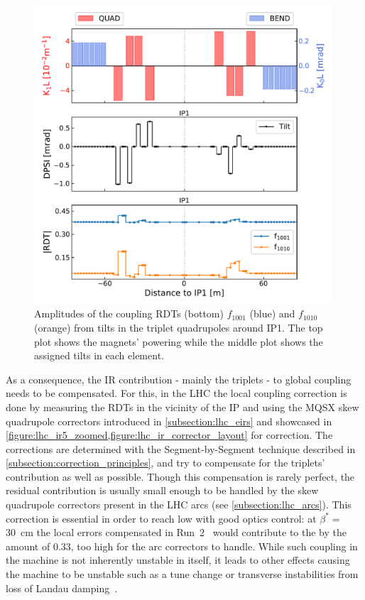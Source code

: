 \begin{figure}[!htb]
    \centering
    \includegraphics*[width=0.99\textwidth]{Figures/IR_Coupling_Correction/triplet_tilts_to_rdts.pdf}
    \caption{Amplitudes of the coupling RDTs (bottom) \(f_{1001}\) (\textcolor{mplblue}{blue}) and \(f_{1010}\) (\textcolor{mplorange}{orange}) from tilts in the triplet quadrupoles around IP\num{1}. The top plot shows the magnets' powering while the middle plot shows the assigned tilts in each element.}
    \label{figure:triplet_tilts_to_rdts}
\end{figure}

As a consequence, the IR contribution - mainly the triplets - to global coupling needs to be compensated.
For this, in the LHC the local coupling correction is done by measuring the RDTs in the vicinity of the IP and using the MQSX \gls{skew} quadrupole correctors introduced in \cref{subsection:lhc_eirs} and showcased in \cref{figure:lhc_ir5_zoomed,figure:lhc_ir_corrector_layout} for correction.
The corrections are determined with the Segment-by-Segment technique described in \cref{subsection:correction_principles}, and try to compensate for the triplets' contribution as well as possible.
Though this compensation is rarely perfect, the residual contribution is usually small enough to be handled by the skew quadrupole correctors present in the LHC arcs (see \cref{subsection:lhc_arcs}).
This correction is essential in order to reach low  with good optics control: at \(\beta^{*}=\) \qty{30}{\centi\meter} the local errors compensated in Run~\num{2}~\cite{CERN:Persson:LHCOpticsCorrectionsEvian2019} would contribute to the  by the amount of \num{0.33}, too high for the arc correctors to handle.
While such coupling in the machine is not inherently unstable in itself, it leads to other effects causing the machine to be unstable such as a tune change or transverse instabilities from loss of Landau damping~\cite{MASTERS:Soubelet:Optics_Octupole_PyHEADTAIL,PRAB:Carver:Transverse_Instabilities_With_Coupling}.

